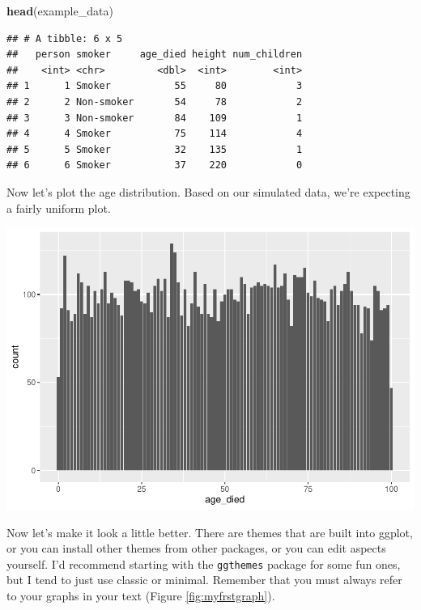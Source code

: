 \documentclass[
]{book}
\newenvironment{Shaded}{\begin{snugshade}}{\end{snugshade}}
\newcommand{\DataTypeTok}[1]{\textcolor[rgb]{0.13,0.29,0.53}{#1}}
\newcommand{\KeywordTok}[1]{\textcolor[rgb]{0.13,0.29,0.53}{\textbf{#1}}}
\newcommand{\NormalTok}[1]{#1}
\newcommand{\OperatorTok}[1]{\textcolor[rgb]{0.81,0.36,0.00}{\textbf{#1}}}
\newcommand{\StringTok}[1]{\textcolor[rgb]{0.31,0.60,0.02}{#1}}
\begin{document}
\begin{Shaded}
\begin{Highlighting}[]
\KeywordTok{head}\NormalTok{(example_data)}
\end{Highlighting}
\end{Shaded}

\begin{verbatim}
## # A tibble: 6 x 5
##   person smoker     age_died height num_children
##    <int> <chr>         <dbl>  <int>        <int>
## 1      1 Smoker           55     80            3
## 2      2 Non-smoker       54     78            2
## 3      3 Non-smoker       84    109            1
## 4      4 Smoker           75    114            4
## 5      5 Smoker           32    135            1
## 6      6 Smoker           37    220            0
\end{verbatim}

Now let's plot the age distribution. Based on our simulated data, we're expecting a fairly uniform plot.

\begin{Shaded}
\end{Shaded}

\includegraphics{telling_stories_with_data_files/figure-latex/unnamed-chunk-90-1.pdf}

Now let's make it look a little better. There are themes that are built into ggplot, or you can install other themes from other packages, or you can edit aspects yourself. I'd recommend starting with the \texttt{ggthemes} package for some fun ones, but I tend to just use classic or minimal. Remember that you must always refer to your graphs in your text (Figure \ref{fig:myfrstgraph}).
\end{document}
